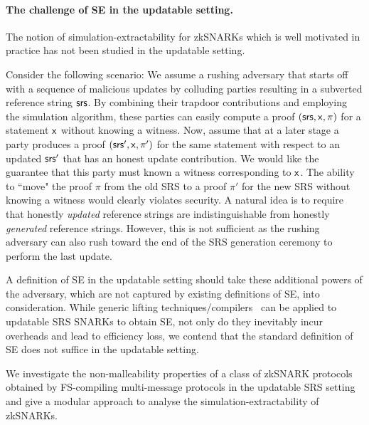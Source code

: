 \paragraph{The challenge of SE in the updatable setting.}

The notion of simulation-extractability for zkSNARKs which is well motivated in practice has not been studied in the updatable setting.

Consider the following scenario: We assume a rushing adversary that starts off with a sequence of malicious updates by colluding parties resulting in a subverted reference string $\mathsf{srs}$. By combining their trapdoor contributions and employing the simulation algorithm, these parties can easily compute a proof $(\mathsf{srs},\mathsf{x},\pi)$ for a statement $\mathsf{x}$ without knowing a witness. Now, assume that at a later stage a party produces a proof $(\mathsf{srs}',\mathsf{x},\pi')$ for the same statement with respect to an updated $\mathsf{srs}'$ that has an honest update contribution. We would like the guarantee that this party must known a witness corresponding to $\mathsf{x}$. The ability to ``move" the proof $\pi$ from the old SRS to a proof $\pi'$ for the new SRS without knowing a witness would clearly violates security. A natural idea is to require that honestly \emph{updated} reference strings are indistinguishable from honestly \emph{generated} reference strings. However, this is not sufficient as the rushing adversary can also rush toward the end of the SRS generation ceremony to perform the last update.


A definition of SE in the updatable setting should take these additional powers of the adversary, which are not captured by existing definitions of SE, into consideration.
While generic lifting techniques/compilers~\cite{EPRINT:KZMQCP15,CCS:AbdRamSla20} can be applied to updatable SRS SNARKs to obtain SE, not only do they inevitably incur overheads and lead to efficiency loss, we contend that the standard definition of SE does not suffice in the updatable setting.




We investigate the non-malleability properties of a class of zkSNARK protocols obtained by FS-compiling multi-message protocols in the updatable SRS setting and give a modular approach to analyse the simulation-extractability of zkSNARKs.
